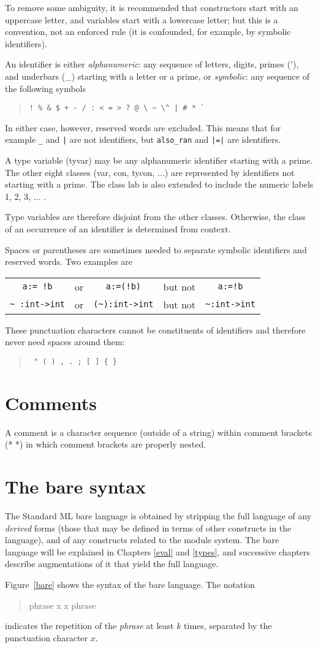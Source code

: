 To remove some ambiguity, it is recommended that constructors start
with an uppercase letter, and variables start with a lowercase
letter; but this is a convention, not an enforced rule  (it is
confounded, for example, by symbolic identifiers).

An identifier is either {\em alphanumeric}: any sequence of letters,
digits, primes ('), and underbars (\_) starting with a letter or a
prime, or {\em symbolic}: any sequence of the following symbols
\begin{quote}
\verb"! % & $ + - / : < = > ? @ \ ~ \^ | # * `"
\end{quote}
In either case, however, reserved words are excluded.  This means
that for example \verb"_" and \verb"|" are not identifiers, but
\verb"also_ran" and \verb"|=|" are identifiers.

A type variable (tyvar) may be any alphanumeric identifier starting
with a prime.  The other eight classes (var, con, tycon, ...)
are represented by identifiers not starting with a prime.  The class
lab is also extended to include the numeric labels 1, 2, 3, ... .

Type variables are therefore disjoint from the other classes.
Otherwise, the class of an occurrence of an identifier is determined
from context.

Spaces or parentheses are sometimes needed 
to separate symbolic identifiers and reserved words.  Two examples are

\begin{tabular}{c c c c c}
\verb"a:= !b" &or& \verb"a:=(!b)" &but not& \verb"a:=!b"\\
\verb"~ :int->int" &or& \verb"(~):int->int" &but not& \verb"~:int->int"
\end{tabular}

These punctuation characters cannot be constituents of identifiers
and therefore never need spaces around them:
\begin{quotation}
\verb| " ( ) , . ; [ ] { } |
\end{quotation}

\section{Comments}
A comment is a character sequence (outside of a string)
within comment brackets (* *) in which comment brackets are properly
nested.

\section{The bare syntax}
The Standard ML bare language is obtained by stripping the full
language of any {\em derived} forms (those that may be defined in
terms of other constructs in the language), and of any constructs
related to the module system.  The bare language will be explained
in Chapters \ref{eval} and \ref{types},
and successive chapters describe augmentations
of it that yield the full language.

Figure~\ref{bare} shows the syntax of the bare language.  The notation
\begin{quotation}
phrase x  x phrase
\end{quotation}
indicates the repetition of the {\em phrase} at least $k$  times,
separated by the punctuation character $x$.
